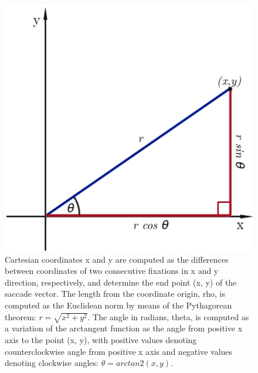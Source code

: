 \documentclass[a4paper, 11pt]{scrreprt}
\begin{document}
\begin{figure}[H]
		\includegraphics[scale=0.4]{img/Polar_to_cartesian.png}
		\caption[Geometric representation of eye movements]
		{\small{Cartesian coordinates x and y are computed as the differences between coordinates of two consecutive fixations in x and y direction, respectively, and determine the end point (x, y) of the saccade vector. The length from the coordinate origin, rho, is computed as the Euclidean norm by means of the Pythagorean theorem: $r = \sqrt{ x^2 + y^2}$. The angle in radians, theta, is computed as a variation of the arctangent function as the angle from positive x axis to the point (x, y), with positive values denoting counterclockwise angle from positive x axis and negative values denoting clockwise angles: $\theta = arctan2(x, y)$.}}
		\label{fig:Polar_to_cartesian}
\end{figure}
\end{document}
